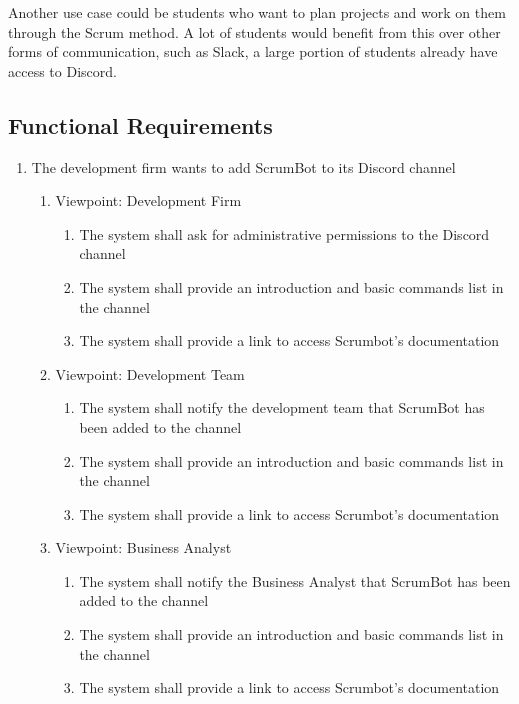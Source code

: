 \documentclass[12pt, titlepage]{article}
\begin{document}
Another use case could be students who want to plan projects and work on them through the Scrum method. A lot of students would benefit from this over other forms of communication, such as Slack, a large portion of students already have access to Discord.

\subsection{Functional Requirements}
\begin{enumerate}[{BE}1.]
    \item The development firm wants to add ScrumBot to its Discord channel
    \begin{enumerate}[{VP}1.]
        \item Viewpoint: Development Firm
            \begin{enumerate}
                \item The system shall ask for administrative permissions to the Discord channel
                \item The system shall provide an introduction and basic commands list in the channel
                \item The system shall provide a link to access Scrumbot's documentation
            \end{enumerate}
        \item Viewpoint: Development Team
            \begin{enumerate}
                \item The system shall notify the development team that ScrumBot has been added to the channel
                \item The system shall provide an introduction and basic commands list in the channel
                \item The system shall provide a link to access Scrumbot's documentation
            \end{enumerate}
            
        \item Viewpoint: Business Analyst
            \begin{enumerate}
                \item The system shall notify the Business Analyst that ScrumBot has been added to the channel
                \item The system shall provide an introduction and basic commands list in the channel
                \item The system shall provide a link to access Scrumbot's documentation
            \end{enumerate}
            

\end{enumerate}
\end{enumerate}
\end{document}
